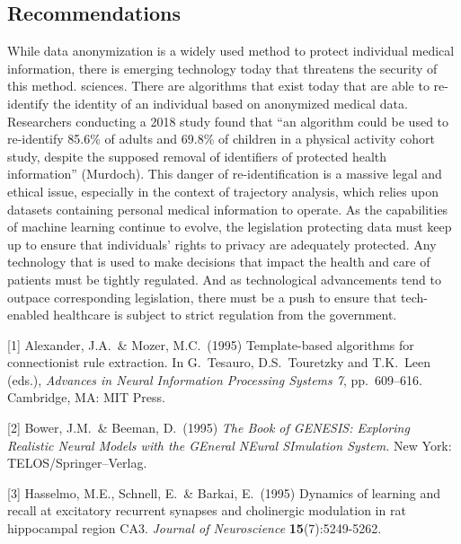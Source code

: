 \documentclass{article}
\begin{document}
\subsection{Recommendations}
While data anonymization is a widely used method to protect individual medical information, there is emerging technology today that threatens the security of this method.  sciences.   There are algorithms that exist today that are able to re-identify the identity of an individual based on anonymized medical data. Researchers conducting a 2018 study found that “an algorithm could be used to re-identify 85.6\% of adults and 69.8\% of children in a physical activity cohort study, despite the supposed removal of identifiers of protected health information” (Murdoch).  This danger of re-identification is a massive legal and ethical issue, especially in the context of trajectory analysis, which relies upon datasets containing personal medical information to operate.  As the capabilities of machine learning continue to evolve, the legislation protecting data must keep up to ensure that individuals’ rights to privacy are adequately protected.  Any technology that is used to make decisions that impact the health and care of patients must be tightly regulated.  And as technological advancements tend to outpace corresponding legislation, there must be a push to ensure that tech-enabled healthcare is subject to strict regulation from the government.
\newpage

[1] Alexander, J.A.\ \& Mozer, M.C.\ (1995) Template-based algorithms for
connectionist rule extraction. In G.\ Tesauro, D.S.\ Touretzky and T.K.\ Leen
(eds.), {\it Advances in Neural Information Processing Systems 7},
pp.\ 609--616. Cambridge, MA: MIT Press.


[2] Bower, J.M.\ \& Beeman, D.\ (1995) {\it The Book of GENESIS: Exploring
  Realistic Neural Models with the GEneral NEural SImulation System.}  New York:
TELOS/Springer--Verlag.


[3] Hasselmo, M.E., Schnell, E.\ \& Barkai, E.\ (1995) Dynamics of learning and
recall at excitatory recurrent synapses and cholinergic modulation in rat
hippocampal region CA3. {\it Journal of Neuroscience} {\bf 15}(7):5249-5262.
\end{document}
